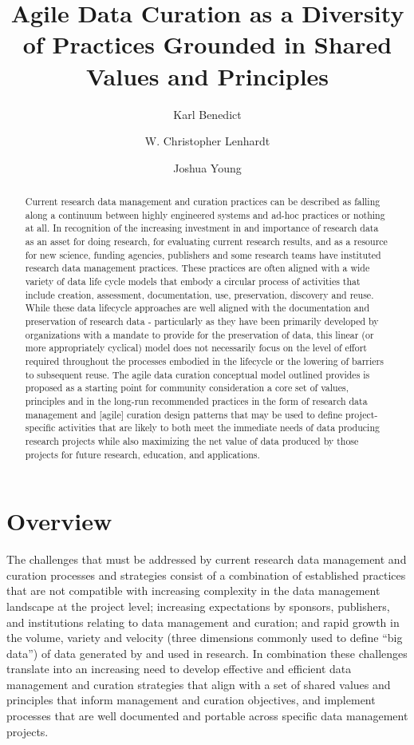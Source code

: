 \documentclass[paper]{ijdc-v9}
\title[Agile Data Curation]{Agile Data Curation as a Diversity of Practices Grounded in Shared
Values and Principles}
\author{Karl Benedict}
\affil{University of New Mexico}
\author{W. Christopher Lenhardt}
\affil{Renaissance Computing Institute}
\author{Joshua Young}
\affil{University Corporation for Atmospheric Research}
\begin{document}
\maketitle

\begin{abstract}
Current research data management and curation practices can be described
as falling along a continuum between highly engineered systems and
ad-hoc practices or nothing at all. In recognition of the increasing
investment in and importance of research data as an asset for doing
research, for evaluating current research results, and as a resource for
new science, funding agencies, publishers and some research teams have
instituted research data management practices. These practices are often
aligned with a wide variety of data life cycle models that embody a
circular process of activities that include creation, assessment,
documentation, use, preservation, discovery and reuse. While these data
lifecycle approaches are well aligned with the documentation and
preservation of research data - particularly as they have been primarily
developed by organizations with a mandate to provide for the
preservation of data, this linear (or more appropriately cyclical) model
does not necessarily focus on the level of effort required throughout
the processes embodied in the lifecycle or the lowering of barriers to
subsequent reuse. The agile data curation conceptual model outlined
provides is proposed as a starting point for community consideration a
core set of values, principles and in the long-run recommended practices
in the form of research data management and {[}agile{]} curation design
patterns that may be used to define project-specific activities that are
likely to both meet the immediate needs of data producing research
projects while also maximizing the net value of data produced by those
projects for future research, education, and applications.
\end{abstract}

\section{Overview}\label{overview}

The challenges that must be addressed by current research data
management and curation processes and strategies consist of a
combination of established practices that are not compatible with
increasing complexity in the data management landscape at the project
level; increasing expectations by sponsors, publishers, and institutions
relating to data management and curation; and rapid growth in the
volume, variety and velocity (three dimensions commonly used to define
``big data'') of data generated by and used in research. In combination
these challenges translate into an increasing need to develop effective
and efficient data management and curation strategies that align with a
set of shared values and principles that inform management and curation
objectives, and implement processes that are well documented and
portable across specific data management projects.
\end{document}
